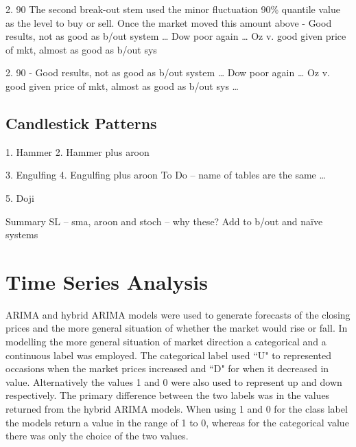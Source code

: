 

2.	90%
The second break-out stem used the minor fluctuation 90\% quantile value as the level to buy or sell. Once the market moved this amount above
-	Good results, not as good as b/out system … Dow poor again … Oz v. good given price of mkt, almost as good as b/out sys 

2.	90%
-	Good results, not as good as b/out system … Dow poor again … Oz v. good given price of mkt, almost as good as b/out sys …

\subsection{Candlestick Patterns}
1.	Hammer
2.	Hammer plus aroon

3.	Engulfing
4.	Engulfing plus aroon
To Do – name of tables are the same …

5.	Doji


Summary
SL – sma, aroon and stoch – why these?  Add to b/out and naïve systems



\section{Time Series Analysis}
ARIMA and hybrid ARIMA models were used to generate forecasts of the closing prices and the more general situation of whether the market would rise or fall. In modelling the more general situation of market direction a categorical and a continuous label was employed. The categorical label used \textquotedblleft U" to represented occasions when the market prices increased and \textquotedblleft D" for when it decreased in value. Alternatively the values 1 and 0 were also used to represent up and down respectively. The primary difference between the two labels was in the values returned from the hybrid ARIMA models. When using 1 and 0 for the class label the models return a value in the range of 1 to 0, whereas for the categorical value there was only the choice of the two values. 

